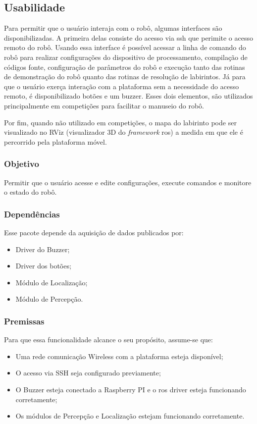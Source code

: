 \subsection{Usabilidade}
\label{ssec:funcionalidade_usabilidade} 
Para permitir que o usuário interaja com o robô, algumas interfaces são disponibilizadas. A primeira delas consiste do acesso via \gls*{ssh} que perimite o acesso remoto do robô. Usando essa interface é possível acessar a linha de comando do robô para realizar configurações do dispositivo de processamento, compilação de códigos fonte, configuração de parâmetros do robô e execução tanto das rotinas de demonstração do robô quanto das rotinas de resolução de labirintos. Já para que o usuário exerça interação com a plataforma sem a necessidade do acesso remoto, é disponibilizado botões e um buzzer. Esses dois elementos, são utilizados principalmente em competições para facilitar o manuseio do robô.
 
Por fim, quando não utilizado em competições, o mapa do labirinto pode ser visualizado no RViz (visualizador 3D do \textit{framework} \gls*{ros}) a medida em que ele é percorrido pela plataforma móvel.

\subsubsection{Objetivo}
Permitir que o usuário acesse e edite configurações, execute comandos e monitore o estado do robô.

\subsubsection{Dependências}
Esse pacote depende da aquisição de dados publicados por:
\begin{itemize}
	\item Driver do Buzzer;
	\item Driver dos botões;
	\item Módulo de Localização;
	\item Módulo de Percepção.
\end{itemize}

\subsubsection{Premissas}
Para que essa funcionalidade alcance o seu propósito, assume-se que:
\begin{itemize}
	\item Uma rede comunicação Wireless com a plataforma esteja disponível;
	\item O acesso via SSH seja configurado previamente;
	\item O Buzzer esteja conectado a Raspberry PI e o \gls*{ros} driver esteja funcionando corretamente;
	\item  Os módulos de Percepção e Localização estejam funcionando corretamente.
\end{itemize}

